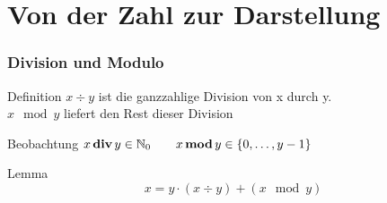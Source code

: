 %
%

\section{Von der Zahl zur Darstellung}
\begin{frame}
	\frametitle{Division und Modulo}
	\begin{block}{Definition}
		$ x \div y$ ist die ganzzahlige Division von x durch y.\\
		$ x \mod y$ liefert den Rest dieser Division
	\end{block} 
	\pause
	
	\begin{block}{Beobachtung}
		$ x\mathop{\textbf{div}} y \in \mathbb{N}_0 \qquad x\mathop{\textbf{mod}} y \in \{0,\dots, y-1\} $
	\end{block}
	\pause
	
	\begin{block}{Lemma}
		$$ x = y \cdot (x \div y ) + \left( x \mod y \right)$$ 
	\end{block}
	
\end{frame}

